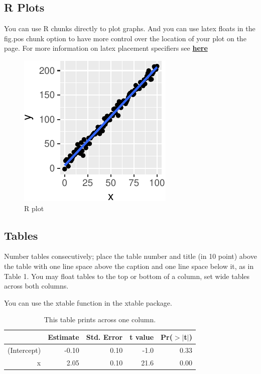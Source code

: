 \documentclass[10pt, letterpaper]{article}
\newenvironment{CodeChunk}{}{}
\begin{document}
\subsection{R Plots}\label{r-plots}

You can use R chunks directly to plot graphs. And you can use latex
floats in the fig.pos chunk option to have more control over the
location of your plot on the page. For more information on latex
placement specifiers see
\textbf{\href{https://en.wikibooks.org/wiki/LaTeX/Floats,_Figures_and_Captions}{here}}

\begin{CodeChunk}
\begin{figure}[H]

{\centering \includegraphics{figs/plot-1} 

}

\caption[R plot]{R plot}\label{fig:plot}
\end{figure}
\end{CodeChunk}

\subsection{Tables}\label{tables}

Number tables consecutively; place the table number and title (in 10
point) above the table with one line space above the caption and one
line space below it, as in Table 1. You may float tables to the top or
bottom of a column, set wide tables across both columns.

You can use the xtable function in the xtable package.

\begin{table}[H]
\centering
\begin{tabular}{rrrrr}
  \hline
 & Estimate & Std. Error & t value & Pr($>$$|$t$|$) \\ 
  \hline
(Intercept) & -0.10 & 0.10 & -1.0 & 0.33 \\ 
  x & 2.05 & 0.10 & 21.6 & 0.00 \\ 
   \hline
\end{tabular}
\caption{This table prints across one column.} 
\end{table}
\end{document}
